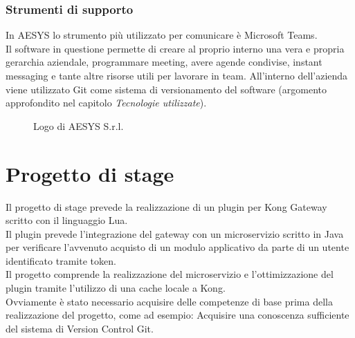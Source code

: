 \subsubsection{Strumenti di supporto}\label{sec:strumentidisupporto}
In AESYS lo strumento più utilizzato per comunicare è Microsoft Teams.\\
Il software in questione permette di creare al proprio interno una vera e propria gerarchia aziendale, programmare meeting, avere agende condivise, instant messaging e tante altre risorse utili per lavorare in team.
All’interno dell’azienda viene utilizzato Git come sistema di versionamento del software (argomento approfondito nel capitolo \emph{Tecnologie utilizzate}).\\

\begin{figure}[ht]
	\centering
	\caption{Logo di AESYS S.r.l.}
	\label{fig:one}
\end{figure}

\section{Progetto di stage}\label{sec:progetto}
Il progetto di stage prevede la realizzazione di un plugin per Kong Gateway scritto con il linguaggio Lua.\\
Il plugin prevede l'integrazione del gateway con un microservizio scritto in Java per verificare l'avvenuto acquisto di un modulo applicativo da parte di un utente identificato tramite token.\\
Il progetto comprende la realizzazione del microservizio e l'ottimizzazione del plugin tramite l'utilizzo di una cache locale a Kong.\\

Ovviamente è stato necessario acquisire delle competenze di base prima della realizzazione del progetto, come ad esempio:
Acquisire una conoscenza sufficiente del sistema di Version Control Git.

